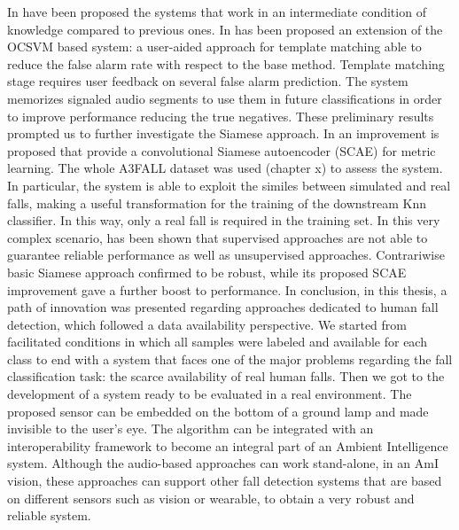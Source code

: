 In  have been proposed the systems that work in an intermediate condition of knowledge compared to previous ones. In  has been proposed an extension of the OCSVM based system: a user-aided approach for template matching able to reduce the false alarm rate with respect to the base method. Template matching stage requires user feedback on several false alarm prediction. The system memorizes signaled audio segments to use them in future classifications in order to improve performance reducing the true negatives.
These preliminary results prompted us to further investigate the Siamese approach. In  an improvement is proposed that provide a convolutional Siamese autoencoder (SCAE) for metric learning.  The whole A3FALL dataset was used (chapter x)  to assess the system. In particular,  the system is able to exploit the similes between simulated and real falls, making a useful transformation for the training of the downstream Knn classifier. In this way, only a real fall is required in the training set. In this very complex scenario, has been shown that supervised approaches are not able to guarantee reliable performance as well as unsupervised approaches. Contrariwise basic Siamese approach confirmed to be robust, while its proposed SCAE improvement gave a further boost to performance.
In conclusion, in this thesis, a path of innovation was presented regarding approaches dedicated to human fall detection, which followed a  data availability perspective. We started from facilitated conditions in which all samples were labeled and available for each class to end with a system that faces one of the major problems regarding the fall classification task: the scarce availability of real human falls. Then we got to the development of a system ready to be evaluated in a real environment.  The proposed sensor can be embedded on the bottom of a ground lamp and made invisible to the user's eye. The algorithm can be integrated with an interoperability framework to become an integral part of an Ambient Intelligence system. Although the audio-based approaches can work stand-alone, in an AmI vision, these approaches can support other fall detection systems that are based on different sensors such as vision or wearable, to obtain a very robust and reliable system.